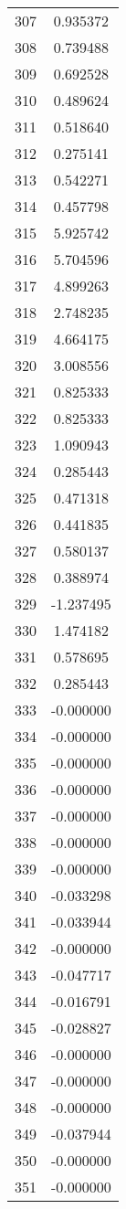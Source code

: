 \documentclass[12pt]{article}
\begin{document}
\begin{longtable}{@{}cc@{}}
307 & 0.935372 \\
308 & 0.739488 \\
309 & 0.692528 \\
310 & 0.489624 \\
311 & 0.518640 \\
312 & 0.275141 \\
313 & 0.542271 \\
314 & 0.457798 \\
315 & 5.925742 \\
316 & 5.704596 \\
317 & 4.899263 \\
318 & 2.748235 \\
319 & 4.664175 \\
320 & 3.008556 \\
321 & 0.825333 \\
322 & 0.825333 \\
323 & 1.090943 \\
324 & 0.285443 \\
325 & 0.471318 \\
326 & 0.441835 \\
327 & 0.580137 \\
328 & 0.388974 \\
329 & -1.237495 \\
330 & 1.474182 \\
331 & 0.578695 \\
332 & 0.285443 \\
333 & -0.000000 \\
334 & -0.000000 \\
335 & -0.000000 \\
336 & -0.000000 \\
337 & -0.000000 \\
338 & -0.000000 \\
339 & -0.000000 \\
340 & -0.033298 \\
341 & -0.033944 \\
342 & -0.000000 \\
343 & -0.047717 \\
344 & -0.016791 \\
345 & -0.028827 \\
346 & -0.000000 \\
347 & -0.000000 \\
348 & -0.000000 \\
349 & -0.037944 \\
350 & -0.000000 \\
351 & -0.000000 \\

\end{longtable}
\end{document}
